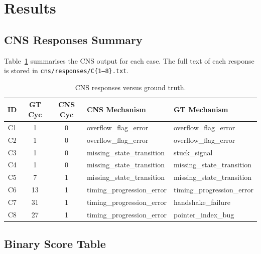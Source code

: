 \documentclass[11pt,a4paper]{article}
\newcommand{\survived}[1]{\textcolor{survred}{#1}}
\begin{document}
\section{Results}

\subsection{CNS Responses Summary}

Table~\ref{tab:responses} summarises the CNS output for each case. The full
text of each response is stored in \texttt{cns/responses/C\{1--8\}.txt}.

\begin{table}[H]
\centering
\small
\caption{CNS responses versus ground truth.}
\label{tab:responses}
\begin{tabular}{cccll}
\toprule
\textbf{ID} & \textbf{GT Cyc} & \textbf{CNS Cyc} &
  \textbf{CNS Mechanism} & \textbf{GT Mechanism} \\
\midrule
C1 & 1  & 0 & overflow\_flag\_error       & overflow\_flag\_error \\
C2 & 1  & 0 & overflow\_flag\_error       & overflow\_flag\_error \\
C3 & 1  & 0 & \survived{missing\_state\_transition} & stuck\_signal \\
C4 & 1  & 0 & missing\_state\_transition  & missing\_state\_transition \\
C5 & 7  & \survived{1} & missing\_state\_transition  & missing\_state\_transition \\
C6 & 13 & \survived{1} & timing\_progression\_error  & timing\_progression\_error \\
C7 & 31 & \survived{1} & \survived{timing\_progression\_error} & handshake\_failure \\
C8 & 27 & \survived{1} & \survived{timing\_progression\_error} & pointer\_index\_bug \\
\bottomrule
\end{tabular}
\end{table}

\subsection{Binary Score Table}
\end{document}
